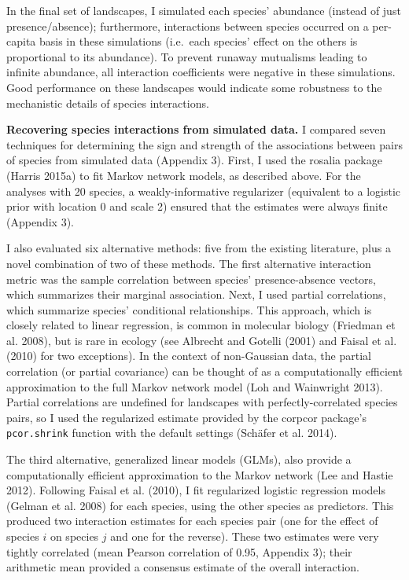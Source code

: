 \documentclass[12pt,]{article}
\begin{document}
\begin{spacing}{1.9}
\begin{flushleft}
In the final set of landscapes, I simulated each species' abundance
(instead of just presence/absence); furthermore, interactions between
species occurred on a per-capita basis in these simulations (i.e.~each
species' effect on the others is proportional to its abundance). To
prevent runaway mutualisms leading to infinite abundance, all
interaction coefficients were negative in these simulations. Good
performance on these landscapes would indicate some robustness to the
mechanistic details of species interactions.

\noindent \textbf{Recovering species interactions from simulated data.}
I compared seven techniques for determining the sign and strength of the
associations between pairs of species from simulated data (Appendix 3).
First, I used the rosalia package (Harris 2015a) to fit Markov network
models, as described above. For the analyses with 20 species, a
weakly-informative regularizer (equivalent to a logistic prior with
location 0 and scale 2) ensured that the estimates were always finite
(Appendix 3).

I also evaluated six alternative methods: five from the existing
literature, plus a novel combination of two of these methods. The first
alternative interaction metric was the sample correlation between
species' presence-absence vectors, which summarizes their marginal
association. Next, I used partial correlations, which summarize species'
conditional relationships. This approach, which is closely related to
linear regression, is common in molecular biology (Friedman et al.
2008), but is rare in ecology (see Albrecht and Gotelli (2001) and
Faisal et al. (2010) for two exceptions). In the context of non-Gaussian
data, the partial correlation (or partial covariance) can be thought of
as a computationally efficient approximation to the full Markov network
model (Loh and Wainwright 2013). Partial correlations are undefined for
landscapes with perfectly-correlated species pairs, so I used the
regularized estimate provided by the corpcor package's
\texttt{pcor.shrink} function with the default settings (Schäfer et al.
2014).

The third alternative, generalized linear models (GLMs), also provide a
computationally efficient approximation to the Markov network (Lee and
Hastie 2012). Following Faisal et al. (2010), I fit regularized logistic
regression models (Gelman et al. 2008) for each species, using the other
species as predictors. This produced two interaction estimates for each
species pair (one for the effect of species \(i\) on species \(j\) and
one for the reverse). These two estimates were very tightly correlated
(mean Pearson correlation of 0.95, Appendix 3); their arithmetic mean
provided a consensus estimate of the overall interaction.


\end{flushleft}
\end{spacing}
\end{document}

